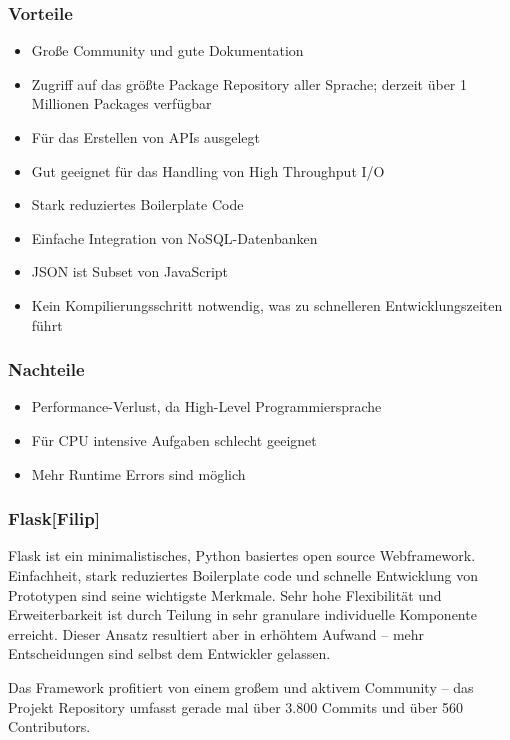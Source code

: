 \subsubsection*{Vorteile}
\begin{itemize}
    \item Große Community und gute Dokumentation
    \item Zugriff auf das größte Package Repository aller Sprache; derzeit über 1
Millionen Packages verfügbar
    \item Für das Erstellen von APIs ausgelegt
    \item Gut geeignet für das Handling von High Throughput I/O
    \item Stark reduziertes Boilerplate Code
    \item Einfache Integration von NoSQL-Datenbanken
    \item JSON ist Subset von JavaScript
    \item Kein Kompilierungsschritt notwendig, was zu schnelleren Entwicklungszeiten führt
\end{itemize}

\subsubsection*{Nachteile}
\begin{itemize}
    \item Performance-Verlust, da High-Level Programmiersprache
    \item Für CPU intensive Aufgaben schlecht geeignet
    \item Mehr Runtime Errors sind möglich
\end{itemize}

\subsubsection*{Flask\hfill[Filip]}
Flask ist ein minimalistisches, Python basiertes open source Webframework. Einfachheit, stark reduziertes Boilerplate code und schnelle Entwicklung von Prototypen sind seine wichtigste Merkmale. Sehr hohe Flexibilität und Erweiterbarkeit ist durch Teilung in sehr granulare individuelle Komponente erreicht. Dieser Ansatz resultiert aber in erhöhtem Aufwand – mehr Entscheidungen sind selbst dem Entwickler gelassen.

Das Framework profitiert von einem großem und aktivem Community – das Projekt Repository umfasst gerade mal über 3.800 Commits und über 560 Contributors.

